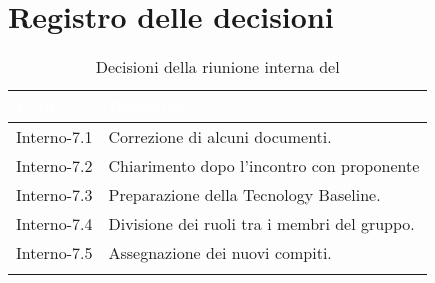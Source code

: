 \section{Registro delle decisioni}
{
\renewcommand{\arraystretch}{1.5}
\centering
\begin{longtable}{C{3cm} C{9cm}}
\textcolor{white}{\textbf{Codice}}&
\textcolor{white}{\textbf{Decisione}}\\	

\endhead
		
Interno-7.1 & Correzione di alcuni documenti.\\
Interno-7.2 & Chiarimento dopo l'incontro con proponente\\
Interno-7.3 & Preparazione della Tecnology Baseline.\\
Interno-7.4 & Divisione dei ruoli tra i membri del gruppo.\\
Interno-7.5 & Assegnazione dei nuovi compiti.\\
\caption{Decisioni della riunione interna del \Data{}}
\end{longtable}
}
